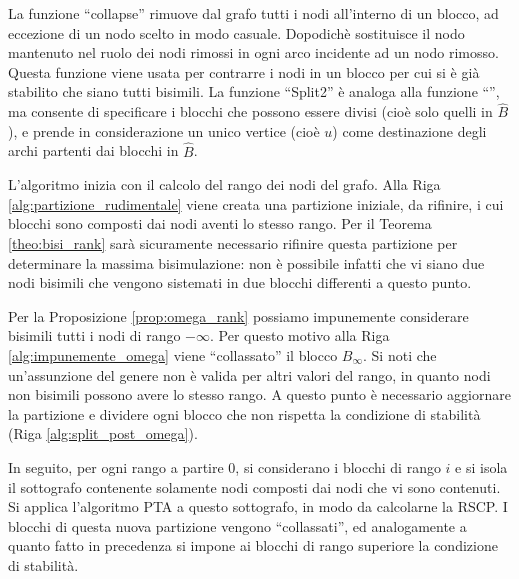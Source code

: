 La funzione ``collapse'' rimuove dal grafo tutti i nodi all'interno di un blocco, ad eccezione di un nodo scelto in modo casuale. Dopodichè sostituisce il nodo mantenuto nel ruolo dei nodi rimossi in ogni arco incidente ad un nodo rimosso. Questa funzione viene usata per contrarre i nodi in un blocco per cui si è già stabilito che siano tutti bisimili. La funzione ``Split2'' è analoga alla funzione ``\splitfunc'', ma consente di specificare i blocchi che possono essere divisi (cioè solo quelli in $\widehat{B}$), e prende in considerazione un unico vertice (cioè $u$) come destinazione degli archi partenti dai blocchi in $\widehat{B}$.

L'algoritmo inizia con il calcolo del rango dei nodi del grafo. Alla Riga \ref{alg:partizione_rudimentale} viene creata una partizione iniziale, da rifinire, i cui blocchi sono composti dai nodi aventi lo stesso rango. Per il Teorema \ref{theo:bisi_rank} sarà sicuramente necessario rifinire questa partizione per determinare la massima bisimulazione: non è possibile infatti che vi siano due nodi bisimili che vengono sistemati in due blocchi differenti a questo punto.

Per la Proposizione \ref{prop:omega_rank} possiamo impunemente considerare bisimili tutti i nodi di rango $-\infty$. Per questo motivo alla Riga \ref{alg:impunemente_omega} viene ``collassato'' il blocco $B_\infty$. Si noti che un'assunzione del genere non è valida per altri valori del rango, in quanto nodi non bisimili possono avere lo stesso rango. A questo punto è necessario aggiornare la partizione e dividere ogni blocco che non rispetta la condizione di stabilità (Riga \ref{alg:split_post_omega}).

In seguito, per ogni rango a partire 0, si considerano i blocchi di rango $i$ e si isola il sottografo contenente solamente nodi composti dai nodi che vi sono contenuti. Si applica l'algoritmo PTA a questo sottografo, in modo da calcolarne la RSCP. I blocchi di questa nuova partizione vengono ``collassati'', ed analogamente a quanto fatto in precedenza si impone ai blocchi di rango superiore la condizione di stabilità.

